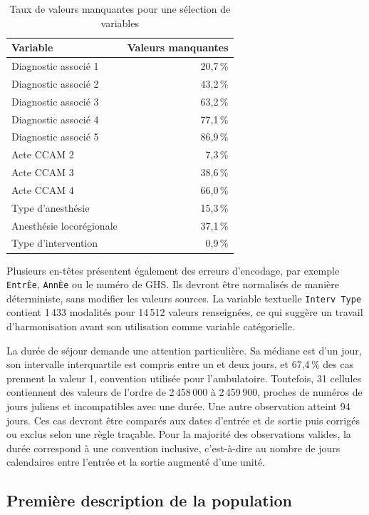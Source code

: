 \begin{table}[htbp]
  \centering
  \caption{Taux de valeurs manquantes pour une sélection de variables}
  \label{tab:valeurs-manquantes}
  \begin{tabular}{@{}lr@{}}
    \toprule
    Variable & Valeurs manquantes \\
    \midrule
    Diagnostic associé 1 & 20,7\,\% \\
    Diagnostic associé 2 & 43,2\,\% \\
    Diagnostic associé 3 & 63,2\,\% \\
    Diagnostic associé 4 & 77,1\,\% \\
    Diagnostic associé 5 & 86,9\,\% \\
    Acte CCAM 2 & 7,3\,\% \\
    Acte CCAM 3 & 38,6\,\% \\
    Acte CCAM 4 & 66,0\,\% \\
    Type d'anesthésie & 15,3\,\% \\
    Anesthésie locorégionale & 37,1\,\% \\
    Type d'intervention & 0,9\,\% \\
    \bottomrule
  \end{tabular}
\end{table}

Plusieurs en-têtes présentent également des erreurs d'encodage, par exemple \texttt{EntrÈe}, \texttt{AnnÈe} ou le numéro de GHS. Ils devront être normalisés de manière déterministe, sans modifier les valeurs sources. La variable textuelle \texttt{Interv Type} contient 1\,433 modalités pour 14\,512 valeurs renseignées, ce qui suggère un travail d'harmonisation avant son utilisation comme variable catégorielle.

La durée de séjour demande une attention particulière. Sa médiane est d'un jour, son intervalle interquartile est compris entre un et deux jours, et 67,4\,\% des cas prennent la valeur 1, convention utilisée pour l'ambulatoire. Toutefois, 31 cellules contiennent des valeurs de l'ordre de 2\,458\,000 à 2\,459\,900, proches de numéros de jours juliens et incompatibles avec une durée. Une autre observation atteint 94 jours. Ces cas devront être comparés aux dates d'entrée et de sortie puis corrigés ou exclus selon une règle traçable. Pour la majorité des observations valides, la durée correspond à une convention inclusive, c'est-à-dire au nombre de jours calendaires entre l'entrée et la sortie augmenté d'une unité.

\subsection{Première description de la population}

